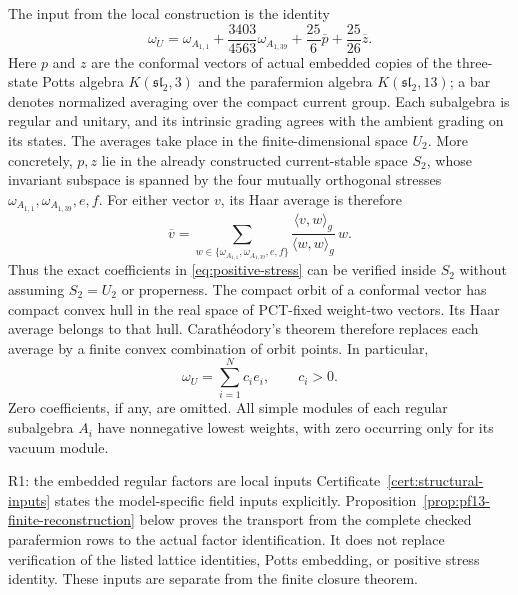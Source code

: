 The input from the local construction is the identity
\begin{equation}
 \omega_U=\omega_{A_{1,1}}
   +\frac{3403}{4563}\omega_{A_{1,39}}
   +\frac{25}{6}\overline p+\frac{25}{26}\overline z.
 \label{eq:positive-stress}
\end{equation}
Here $p$ and $z$ are the conformal vectors of actual embedded copies of
the three-state Potts algebra $K(\mathfrak{sl}_2,3)$ and the parafermion
algebra $K(\mathfrak{sl}_2,13)$; a bar denotes normalized averaging over
the compact current group. Each subalgebra is regular and unitary, and
its intrinsic grading agrees with the ambient grading on its states.
The averages take place in the finite-dimensional space $U_2$.
More concretely, $p,z$ lie in the already constructed current-stable
space $S_2$, whose invariant subspace is spanned by the four mutually
orthogonal stresses $\omega_{A_{1,1}},\omega_{A_{1,39}},e,f$.
For either vector $v$, its Haar average is therefore
\[
 \overline v=\sum_{w\in\{\omega_{A_{1,1}},\omega_{A_{1,39}},e,f\}}
       \frac{\langle v,w\rangle_g}{\langle w,w\rangle_g}\,w.
\]
Thus the exact coefficients in \eqref{eq:positive-stress} can be
verified inside $S_2$ without assuming $S_2=U_2$ or properness.
The compact orbit of a conformal vector has compact convex hull in the
real space of PCT-fixed weight-two vectors. Its Haar average belongs
to that hull. Carath\'eodory's theorem therefore replaces each average
by a finite convex combination of orbit points. In particular,
\begin{equation}
 \omega_U=\sum_{i=1}^N c_i e_i,\qquad c_i>0.
 \label{eq:finite-positive-stress}
\end{equation}
Zero coefficients, if any, are omitted. All simple modules of each
regular subalgebra $A_i$ have nonnegative lowest weights, with zero
occurring only for its vacuum module.

\begin{reviewnote}{R1: the embedded regular factors are local inputs}
Certificate~\ref{cert:structural-inputs} states the model-specific
field inputs explicitly. Proposition~\ref{prop:pf13-finite-reconstruction}
below proves the transport from the complete checked parafermion rows
to the actual factor identification. It does not replace verification
of the listed lattice identities, Potts embedding, or positive stress
identity. These inputs are separate from the finite closure theorem.
\end{reviewnote}


